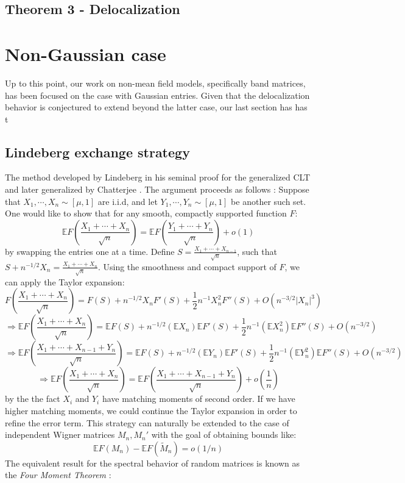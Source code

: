 \documentclass[11pt]{article}
\begin{document}
\subsection{Theorem 3 - Delocalization}
\label{proof-deloc}


\newpage

\section{Non-Gaussian case}
\label{sec:non-gaussian}
Up to this point, our work on non-mean field models, specifically band matrices, has been focused on the case with Gaussian entries. Given that the delocalization behavior is conjectured to extend beyond the latter case, our last section has has t


\subsection{Lindeberg exchange strategy}
The method developed by Lindeberg in his seminal proof for the generalized CLT \cite{lindeberg} and later generalized by Chatterjee \cite{chatterjee}. The argument proceeds as follows \cite{tao}: Suppose that $X_1, \cdots, X_n\sim [\mu, 1]$ are i.i.d, and let $Y_1, \cdots, Y_n\sim[\mu, 1]$ be another such set. One would like to show that for any smooth, compactly supported function $F$: $$\mathbb{E}F\left(\frac{X_1+\cdots+X_n}{\sqrt{n}}\right) = \mathbb{E}F\left(\frac{Y_1+\cdots+Y_n}{\sqrt{n}}\right)+o(1)$$
by swapping the entries one at a time. Define
$S= \frac{X_1+\cdots+X_{n-1}}{\sqrt{n}}$, such that $S+n^{-1/2}X_n = \frac{X_1+\cdots+X_n}{\sqrt{n}}$. Using the smoothness and compact support of $F$, we can apply the Taylor expansion: $$F\left(\frac{X_1+\cdots+X_n}{\sqrt{n}}\right)=F(S)+n^{-1/2}X_nF'(S)+\frac{1}{2}n^{-1}X_n^2 F''(S) + O(n^{-3/2}|X_n|^3)$$
$$\Rightarrow \mathbb{E}F\left(\frac{X_1+\cdots+X_n}{\sqrt{n}}\right)=\mathbb{E}F(S)+n^{-1/2}(\mathbb{E}X_n)\mathbb{E}F'(S)+\frac{1}{2}n^{-1}(\mathbb{E}X_n^2)\mathbb{E}F''(S) + O(n^{-3/2})$$
$$\Rightarrow \mathbb{E}F\left(\frac{X_1+\cdots+X_{n-1}+Y_n}{\sqrt{n}}\right)=\mathbb{E}F(S)+n^{-1/2}(\mathbb{E}Y_n)\mathbb{E}F'(S)+\frac{1}{2}n^{-1}(\mathbb{E}Y_n^2)\mathbb{E}F''(S) +O (n^{-3/2})$$
$$\Rightarrow \mathbb{E}F\left(\frac{X_1+\cdots+X_n}{\sqrt{n}}\right) = \mathbb{E}F\left(\frac{X_1+\cdots+X_{n-1}+Y_n}{\sqrt{n}}\right)+o\left(\frac{1}{n}\right)$$
by the the fact $X_i$ and $Y_i$ have matching moments of second order. If we have higher matching moments, we could continue the Taylor expansion in order to refine the error term.
This strategy can naturally be extended to the case of independent Wigner matrices $M_n, M_n'$ with the goal of obtaining bounds like: $$\mathbb{E}F(M_n)-\mathbb{E}F(\tilde{M}_n)=o(1/n)$$
The equivalent result for the spectral behavior of random matrices is known as the \textit{Four Moment Theorem } \cite{tao2}:
\end{document}
